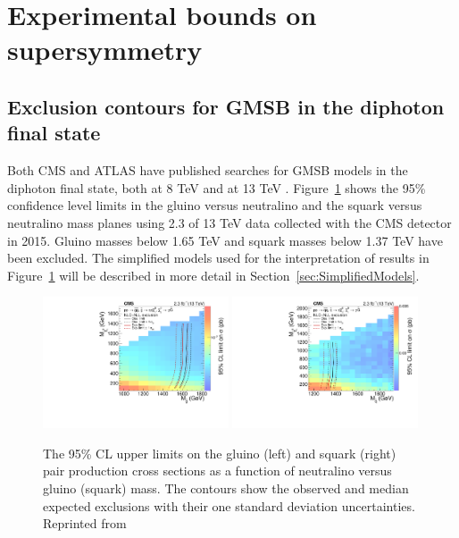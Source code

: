 \section{Experimental bounds on supersymmetry}
\label{sec:SUSYlimits}



\subsection{Exclusion contours for GMSB in the diphoton final state}
\label{sec:GMSBlimits}
Both CMS and ATLAS have published searches for GMSB models in the diphoton final state, both at 8 TeV \cite{Aad:2015hea,Khachatryan:2015exa} and at 13 TeV \cite{ATLAS:2016aa,CMS:2015_anal}. Figure~\ref{fig:Limits2015CMS} shows the 95\% confidence level limits in the gluino versus neutralino and the squark versus neutralino mass planes using 2.3 \fbinv of 13 TeV data collected with the CMS detector in 2015. 
Gluino masses below 1.65 TeV and squark masses below 1.37 TeV have been excluded.
The simplified models used for the interpretation of results in Figure~\ref{fig:Limits2015CMS} will be described in more detail in Section~\ref{sec:SimplifiedModels}.

\begin{figure}[h]
\begin{center}
\includegraphics[width=0.49\textwidth]{Figures/Theory/2015gg.pdf}
\includegraphics[width=0.49\textwidth]{Figures/Theory/2015qq.pdf}
\end{center}
    \caption{The 95\% CL upper limits on the gluino (left) and squark (right)
        pair production cross sections as a function of neutralino versus
	gluino (squark) mass. The contours show the observed and median
        expected exclusions with their one
        standard deviation uncertainties. Reprinted from \cite{CMS:2015_anal}}
    \label{fig:Limits2015CMS}
\end{figure}

